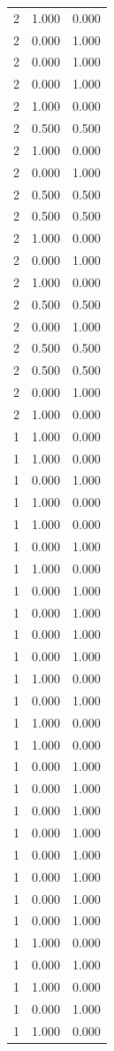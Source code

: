 \begin{tabular}{rrr}
2 & 1.000 & 0.000 \\
2 & 0.000 & 1.000 \\
2 & 0.000 & 1.000 \\
2 & 0.000 & 1.000 \\
2 & 1.000 & 0.000 \\
2 & 0.500 & 0.500 \\
2 & 1.000 & 0.000 \\
2 & 0.000 & 1.000 \\
2 & 0.500 & 0.500 \\
2 & 0.500 & 0.500 \\
2 & 1.000 & 0.000 \\
2 & 0.000 & 1.000 \\
2 & 1.000 & 0.000 \\
2 & 0.500 & 0.500 \\
2 & 0.000 & 1.000 \\
2 & 0.500 & 0.500 \\
2 & 0.500 & 0.500 \\
2 & 0.000 & 1.000 \\
2 & 1.000 & 0.000 \\
1 & 1.000 & 0.000 \\
1 & 1.000 & 0.000 \\
1 & 0.000 & 1.000 \\
1 & 1.000 & 0.000 \\
1 & 1.000 & 0.000 \\
1 & 0.000 & 1.000 \\
1 & 1.000 & 0.000 \\
1 & 0.000 & 1.000 \\
1 & 0.000 & 1.000 \\
1 & 0.000 & 1.000 \\
1 & 0.000 & 1.000 \\
1 & 1.000 & 0.000 \\
1 & 0.000 & 1.000 \\
1 & 1.000 & 0.000 \\
1 & 1.000 & 0.000 \\
1 & 0.000 & 1.000 \\
1 & 0.000 & 1.000 \\
1 & 0.000 & 1.000 \\
1 & 0.000 & 1.000 \\
1 & 0.000 & 1.000 \\
1 & 0.000 & 1.000 \\
1 & 0.000 & 1.000 \\
1 & 0.000 & 1.000 \\
1 & 1.000 & 0.000 \\
1 & 0.000 & 1.000 \\
1 & 1.000 & 0.000 \\
1 & 0.000 & 1.000 \\
1 & 1.000 & 0.000 \\
\bottomrule
\end{tabular}
